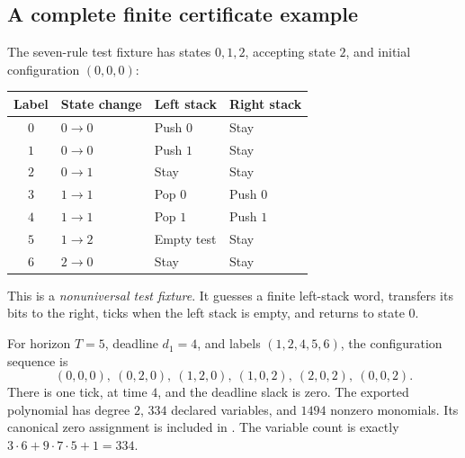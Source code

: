 \documentclass[11pt,letterpaper]{article}
\theoremstyle{definition}
\theoremstyle{remark}
\newcommand{\1}{\mathbf 1}
\begin{document}
\subsection{A complete finite certificate example}
The seven-rule test fixture has states $0,1,2$, accepting state $2$, and
initial configuration $(0,0,0)$:
\begin{center}\small
\begin{tabular}{@{}clll@{}}
\toprule
Label & State change & Left stack & Right stack\\
\midrule
$0$ & $0\to0$ & Push $0$ & Stay\\
$1$ & $0\to0$ & Push $1$ & Stay\\
$2$ & $0\to1$ & Stay & Stay\\
$3$ & $1\to1$ & Pop $0$ & Push $0$\\
$4$ & $1\to1$ & Pop $1$ & Push $1$\\
$5$ & $1\to2$ & Empty test & Stay\\
$6$ & $2\to0$ & Stay & Stay\\
\bottomrule
\end{tabular}
\end{center}
This is a \emph{nonuniversal test fixture}. It guesses a finite left-stack
word, transfers its bits to the right, ticks when the left stack is empty,
and returns to state $0$.

For horizon $T=5$, deadline $d_1=4$, and labels $(1,2,4,5,6)$, the
configuration sequence is
\[
 (0,0,0),\ (0,2,0),\ (1,2,0),\ (1,0,2),\ (2,0,2),\ (0,0,2).
\]
There is one tick, at time $4$, and the deadline slack is zero. The
exported polynomial has degree $2$, $334$ declared variables, and $1494$
nonzero monomials. Its canonical zero assignment is included in
. The variable count is exactly
$3\cdot6+9\cdot7\cdot5+1=334$.
\end{document}
